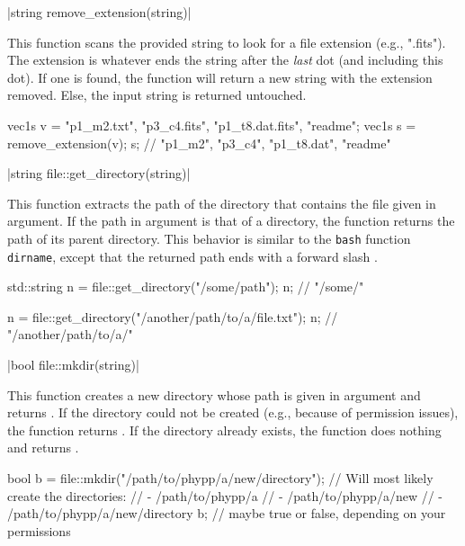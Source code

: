 \funcitem \vectorfunc \cppinline|string remove_extension(string)| 

This function scans the provided string to look for a file extension (e.g., ".fits"). The extension is whatever ends the string after the \emph{last} dot (and including this dot). If one is found, the function will return a new string with the extension removed. Else, the input string is returned untouched.

\begin{example}
\begin{cppcode}
vec1s v = {"p1_m2.txt", "p3_c4.fits", "p1_t8.dat.fits", "readme"};
vec1s s = remove_extension(v);
s; // {"p1_m2", "p3_c4", "p1_t8.dat", "readme"}
\end{cppcode}
\end{example}

\funcitem \vectorfunc \cppinline|string file::get_directory(string)| 

This function extracts the path of the directory that contains the file given in argument. If the path in argument is that of a directory, the function returns the path of its parent directory. This behavior is similar to the \texttt{bash} function \texttt{dirname}, except that the returned path ends with a forward slash \cppinline{/}.

\begin{example}
\begin{cppcode}
std::string n = file::get_directory("/some/path");
n; // "/some/"

n = file::get_directory("/another/path/to/a/file.txt");
n; // "/another/path/to/a/"
\end{cppcode}
\end{example}

\funcitem \vectorfunc \cppinline|bool file::mkdir(string)| 

This function creates a new directory whose path is given in argument and returns \cpptrue. If the directory could not be created (e.g., because of permission issues), the function returns \cppfalse. If the directory already exists, the function does nothing and returns \cpptrue.

\begin{example}
\begin{cppcode}
bool b = file::mkdir("/path/to/phypp/a/new/directory");
// Will most likely create the directories:
//  - /path/to/phypp/a
//  - /path/to/phypp/a/new
//  - /path/to/phypp/a/new/directory
b; // maybe true or false, depending on your permissions
\end{cppcode}
\end{example}

